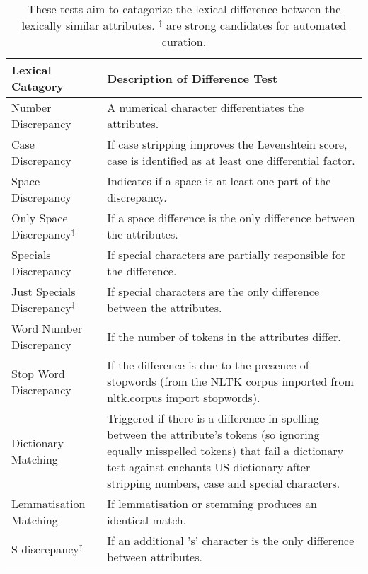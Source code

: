 \documentclass{bmcart}
\begin{document}
\begin{backmatter}
\begin{table}[h!]
\caption{These tests aim to catagorize the lexical difference between the lexically similar attributes. $^\ddagger$ are strong candidates for automated curation.}
      \begin{tabular}{|p{3.5cm}|p{9.5cm}|}
        \hline
        Lexical Catagory & Description of Difference Test  \\ \hline
        Number Discrepancy & A numerical character differentiates the attributes. \\
        Case Discrepancy & If case stripping improves the Levenshtein score, case is identified as at least one differential factor. \\
        Space Discrepancy & Indicates if a space is at least one part of the discrepancy. \\
        Only Space Discrepancy$^\ddagger$  & If a space difference is the only difference between the attributes. \\
        Specials Discrepancy & If special characters are partially responsible for the difference. \\
        Just Specials Discrepancy$^\ddagger$ & If special characters are the only difference between the attributes. \\
        Word Number Discrepancy & If the number of tokens in the attributes differ. \\
        Stop Word Discrepancy & If the difference is due to the presence of stopwords (from the NLTK corpus imported from nltk.corpus import stopwords).  \\
        Dictionary Matching & Triggered if there is a difference in spelling between the attribute's tokens (so ignoring equally misspelled tokens) that fail a dictionary test against enchants US dictionary after stripping numbers, case and special characters. \\
        Lemmatisation Matching &  If lemmatisation or stemming produces an identical match. \\
        S discrepancy$^\ddagger$  & If an additional 's' character is the only difference between attributes. \\

           \hline
      \end{tabular}
\label{table:lexical_catagorisation}
\end{table}




\end{backmatter}
\end{document}

